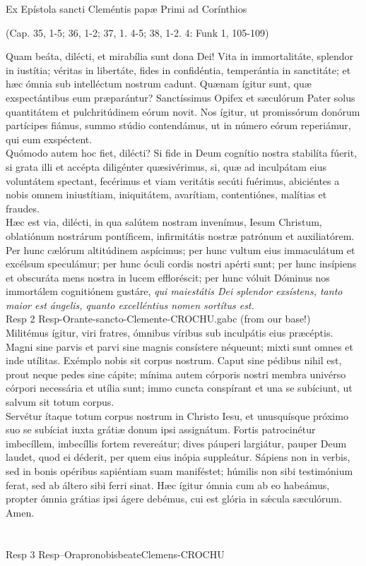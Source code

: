 \documentclass[options]{article}
\begin{document}
	
	Ex Epístola sancti Cleméntis papæ Primi ad Corínthios
	\begin{flushright}
		 (Cap. 35, 1-5; 36, 1-2; 37, 1. 4-5; 38, 1-2. 4: Funk 1, 105-109)
	\end{flushright}

	Quam beáta, dilécti, et mirabília sunt dona Dei! Vita in immortalitáte, splendor in iustítia; véritas in libertáte, fides in confidéntia, temperántia in sanctitáte; et hæc ómnia sub intelléctum nostrum cadunt. Quænam ígitur sunt, quæ exspectántibus eum præparántur? Sanctíssimus Opifex et sæculórum Pater solus quantitátem et pulchritúdinem eórum novit. Nos ígitur, ut promissórum donórum partícipes fiámus, summo stúdio contendámus, ut in número eórum reperiámur, qui eum exspéctent.\\
	
	Quómodo autem hoc fiet, dilécti? Si fide in Deum cognítio nostra stabilíta fúerit, si grata illi et accépta diligénter quæsivérimus, si, quæ ad inculpátam eius voluntátem spectant, fecérimus et viam veritátis secúti fuérimus, abiciéntes a nobis omnem iniustítiam, iniquitátem, avarítiam, contentiónes, malítias et fraudes.\\
	
	Hæc est via, dilécti, in qua salútem nostram invenímus, Iesum Christum, oblatiónum nostrárum pontíficem, infirmitátis nostræ patrónum et auxiliatórem. Per hunc cælórum altitúdinem aspícimus; per hunc vultum eius immaculátum et excélsum speculámur; per hunc óculi cordis nostri apérti sunt; per hunc insípiens et obscuráta mens nostra in lucem effloréscit; per hunc vóluit Dóminus nos immortálem cognitiónem gustáre, \emph{qui maiestátis Dei splendor exsístens, tanto maior est ángelis, quanto excelléntius nomen sortítus est.}\\
	
		Resp 2  Resp-Orante-sancto-Clemente-CROCHU.gabc  (from our base!)\\	
		
	Militémus ígitur, viri fratres, ómnibus víribus sub inculpátis eius præcéptis. Magni sine parvis et parvi sine magnis consístere néqueunt; mixti sunt omnes et inde utílitas. Exémplo nobis sit corpus nostrum. Caput sine pédibus nihil est, prout neque pedes sine cápite; mínima autem córporis nostri membra univérso córpori necessária et utília sunt; immo cuncta conspírant et una se subíciunt, ut salvum sit totum corpus.\\
	
	Servétur ítaque totum corpus nostrum in Christo Iesu, et unusquísque próximo suo se subíciat iuxta grátiæ donum ipsi assignátum. Fortis patrocinétur imbecíllem, imbecíllis fortem revereátur; dives páuperi largiátur, pauper Deum laudet, quod ei déderit, per quem eius inópia suppleátur. Sápiens non in verbis, sed in bonis opéribus sapiéntiam suam maniféstet; húmilis non sibi testimónium ferat, sed ab áltero sibi ferri sinat. Hæc ígitur ómnia cum ab eo habeámus, propter ómnia grátias ipsi ágere debémus, cui est glória in s\'{æ}cula sæculórum. Amen.\\
	\\\\
	
	Resp 3 Resp--OrapronobisbeateClemens-CROCHU   
	
\end{document}
